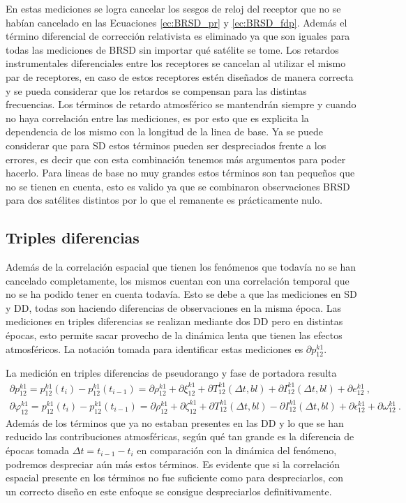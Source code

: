 \documentclass[a4paper,12pt,oneside,onecolumn,final,openright]{book}%
\begin{document}
	En estas mediciones se logra cancelar los sesgos de reloj del receptor que no se habían cancelado en las Ecuaciones \eqref{ec:BRSD_pr} y \eqref{ec:BRSD_fdp}. Además el término diferencial de corrección relativista es eliminado ya que son iguales para todas las mediciones de BRSD sin importar qué satélite se tome. Los retardos instrumentales diferenciales entre los receptores se cancelan al utilizar el mismo par de receptores, en caso de estos receptores estén diseñados de manera correcta y se pueda considerar que los retardos se compensan para las distintas frecuencias. Los términos de retardo atmosférico se mantendrán siempre y cuando no haya correlación entre las mediciones, es por esto que es explicita la dependencia de los mismo con la longitud de la linea de base. Ya se puede considerar que para SD estos términos pueden ser despreciados frente a los errores, es decir que con esta combinación tenemos más argumentos para poder hacerlo. Para lineas de base no muy grandes estos términos son tan pequeños que no se tienen en cuenta, esto es valido ya que se combinaron observaciones BRSD para dos satélites distintos por lo que el remanente es prácticamente nulo.

\subsection{Triples diferencias}
	Además de la correlación espacial que tienen los fenómenos que todavía no se han cancelado completamente, los mismos cuentan con una correlación temporal que no se ha podido tener en cuenta todavía. Esto se debe a que las mediciones en SD y DD, todas son haciendo diferencias de observaciones en la misma época. Las mediciones en triples diferencias se realizan mediante dos DD pero en distintas épocas, esto permite sacar provecho de la dinámica lenta que tienen las efectos atmosféricos. La notación tomada para identificar estas mediciones es $\partial p_{12}^{k1}$.
	
	La medición en triples diferencias de pseudorango y fase de portadora resulta
\begin{align}
	\partial p_{12}^{k1} = p_{12}^{k1}(t_i) - p_{12}^{k1}(t_{i-1}) = \partial\rho_{12}^{k1} + \partial\xi_{12}^{k1} + \partial T_{12}^{k1}(\Delta t,bl) + \partial I_{12}^{k1}(\Delta t,bl) + \partial e_{12}^{k1} \ ,
\end{align}
\begin{align}
	\partial \varphi_{12}^{k1} = p_{12}^{k1}(t_i) - p_{12}^{k1}(t_{i-1}) = \partial\rho_{12}^{k1} + \partial\zeta_{12}^{k1} + \partial T_{12}^{k1}(\Delta t,bl) - \partial I_{12}^{k1}(\Delta t,bl) + \partial \epsilon_{12}^{k1} + \partial\omega_{12}^{k1}\ .
\end{align}
	Además de los términos que ya no estaban presentes en las DD y lo que se han reducido las contribuciones atmosféricas, según qué tan grande es la diferencia de épocas tomada $\Delta t = t_{i-1}-t_i$ en comparación con la dinámica del fenómeno, podremos despreciar aún más estos términos. Es evidente que si la correlación espacial presente en los términos no fue suficiente como para despreciarlos, con un correcto diseño en este enfoque se consigue despreciarlos definitivamente.
\end{document}
